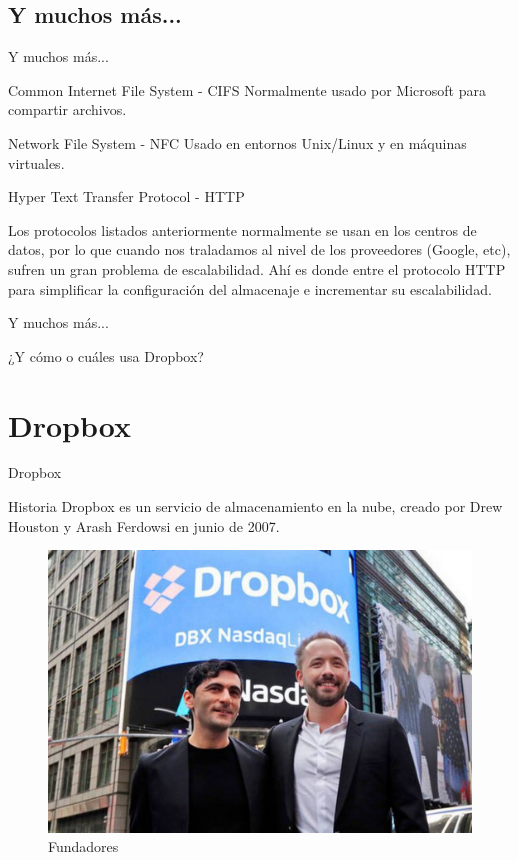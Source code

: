 \documentclass[10pt]{beamer}
\begin{document}
\subsection{Y muchos más...}

\begin{frame}{Y muchos más...}
\begin{alertblock}{Common Internet File System - CIFS}
Normalmente usado por Microsoft para compartir archivos.
\end{alertblock}
\begin{alertblock}{Network File System - NFC}
Usado en entornos Unix/Linux y en máquinas virtuales.
\end{alertblock}
\begin{alertblock}{Hyper Text Transfer Protocol - HTTP}

Los protocolos listados anteriormente normalmente se usan en los centros de datos, por lo que cuando nos traladamos al nivel de los proveedores (Google, etc), sufren un gran problema de escalabilidad. Ahí es donde entre el protocolo HTTP para simplificar la configuración del almacenaje e incrementar su escalabilidad.

\end{alertblock}
\end{frame}

\begin{frame}{Y muchos más...}
\begin{alertblock}{¿Y cómo o cuáles usa Dropbox?}
\end{alertblock}
\end{frame}


\section{Dropbox}

\begin{frame}{Dropbox}
\begin{alertblock}{Historia}
Dropbox es un servicio de almacenamiento en la nube, creado por Drew Houston y Arash Ferdowsi en junio de 2007.
\end{alertblock}
\begin{figure}[h]
  \centering
  \includegraphics[width=0.7\linewidth]{fundadores.jpg}
  \caption{Fundadores}
\end{figure}
\end{frame}
\end{document}
